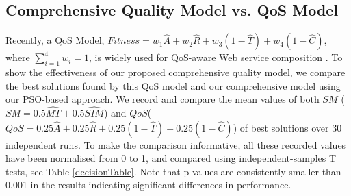 \subsection{Comprehensive Quality Model vs. QoS Model}\label{comparisonTest}

Recently, a QoS Model, $Fitness = w_1 \hat{A} + w_2 \hat{R} + w_3(1 - \hat{T}) + w_4(1 - \hat{C})$, where $\sum_{i=1}^{4} w_i = 1$, is widely used for QoS-aware Web service composition \cite{ma2015hybrid,da2016particle,da2015graphevol}. To show the effectiveness of our proposed comprehensive quality model, we compare the best solutions found by this QoS model and our comprehensive model using our PSO-based approach. We record and compare the mean values of both $SM$ ($SM = 0.5 \hat{MT} + 0.5 \hat{SIM}$) and $QoS$($QoS = 0.25 \hat{A} + 0.25 \hat{R} + 0.25(1 - \hat{T}) + 0.25(1 - \hat{C})$) of best solutions over 30 independent runs. To make the comparison informative, all these recorded values have been normalised from 0 to 1, and compared using independent-samples T tests, see Table \ref{decisionTable}. Note that p-values are consistently smaller than 0.001 in the results indicating significant differences in performance. 

